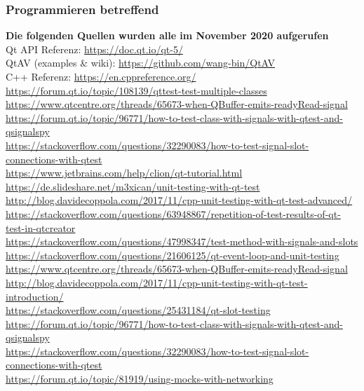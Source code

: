 \documentclass{article}
\begin{document}
    \subsubsection{Programmieren betreffend}
    \textbf{Die folgenden Quellen wurden alle im November 2020 aufgerufen}\\
    Qt API Referenz: \url{https://doc.qt.io/qt-5/} \\
    QtAV (examples \& wiki): \url{https://github.com/wang-bin/QtAV} \\
    C++ Referenz: \url{https://en.cppreference.org/}\\
    \url{https://forum.qt.io/topic/108139/qttest-test-multiple-classes}\\
    \url{https://www.qtcentre.org/threads/65673-when-QBuffer-emits-readyRead-signal}\\
    \url{https://forum.qt.io/topic/96771/how-to-test-class-with-signals-with-qtest-and-qsignalspy}\\
    \url{https://stackoverflow.com/questions/32290083/how-to-test-signal-slot-connections-with-qtest}\\
    \url{https://www.jetbrains.com/help/clion/qt-tutorial.html}\\
    \url{https://de.slideshare.net/m3xican/unit-testing-with-qt-test}\\
    \url{http://blog.davidecoppola.com/2017/11/cpp-unit-testing-with-qt-test-advanced/}\\
    \url{https://stackoverflow.com/questions/63948867/repetition-of-test-results-of-qt-test-in-qtcreator}\\
    \url{https://stackoverflow.com/questions/47998347/test-method-with-signals-and-slots}\\
    \url{https://stackoverflow.com/questions/21606125/qt-event-loop-and-unit-testing}\\
    \url{https://www.qtcentre.org/threads/65673-when-QBuffer-emits-readyRead-signal}\\
    \url{http://blog.davidecoppola.com/2017/11/cpp-unit-testing-with-qt-test-introduction/}\\
    \url{https://stackoverflow.com/questions/25431184/qt-slot-testing}\\
    \url{https://forum.qt.io/topic/96771/how-to-test-class-with-signals-with-qtest-and-qsignalspy}\\
    \url{https://stackoverflow.com/questions/32290083/how-to-test-signal-slot-connections-with-qtest}\\
    \url{https://forum.qt.io/topic/81919/using-mocks-with-networking}\\
\end{document}
